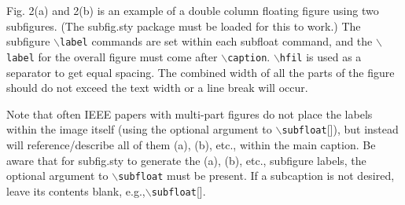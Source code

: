 Fig. 2(a) and 2(b) is an example of a double column floating figure using two subfigures.
(The subfig.sty package must be loaded for this to work.)
The subfigure $\backslash${\tt{label}} commands are set within each subfloat command,
and the $\backslash${\tt{label}} for the overall figure must come after $\backslash${\tt{caption}}.
$\backslash${\tt{hfil}} is used as a separator to get equal spacing.
The combined width of all the parts of the figure should do not exceed the text width or a line break will occur.
%

Note that often IEEE papers with multi-part figures do not place the labels within the image itself (using the optional argument to $\backslash${\tt{subfloat}}[]), but instead will
reference/describe all of them (a), (b), etc., within the main caption.
Be aware that for subfig.sty to generate the (a), (b), etc., subfigure
labels, the optional argument to $\backslash${\tt{subfloat}} must be present. If a
subcaption is not desired, leave its contents blank,
e.g.,$\backslash${\tt{subfloat}}[].